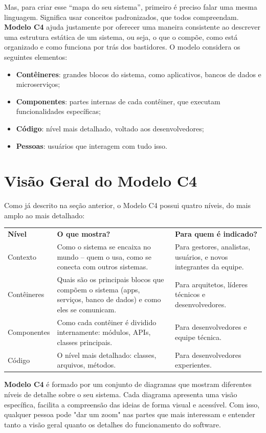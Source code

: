 \documentclass[a4paper,11pt]{article}
\begin{document}
Mas, para criar esse “mapa do seu sistema”, primeiro é preciso falar uma mesma linguagem. Significa usar conceitos padronizados, que todos compreendam. \textbf{Modelo C4} ajuda justamente por oferecer uma maneira consistente ao descrever uma estrutura estática de um sistema, ou seja, o que o compõe, como está organizado e como funciona por trás dos bastidores.
O modelo considera os seguintes elementos:
\begin{itemize}
	\item \textbf{Contêineres}: grandes blocos do sistema, como aplicativos, bancos de dados e microserviços;
	\item \textbf{Componentes}: partes internas de cada contêiner, que executam funcionalidades específicas;
	\item \textbf{Código}: nível mais detalhado, voltado aos desenvolvedores;
	\item \textbf{Pessoas}: usuários que interagem com tudo isso.
\end{itemize}

\section{Visão Geral do Modelo C4}
Como já descrito na seção anterior, o Modelo C4 possui quatro níveis, do mais amplo ao mais
detalhado:

\begin{table}[H]
	\centering 
	\begin{tabular}{C{2.3cm} | C{5.5cm} | C{5cm} }
		\textbf{Nível} & \textbf{O que mostra?} & \textbf{Para quem é indicado?} \\
		Contexto & Como o sistema se encaixa no mundo -- quem o usa, como se conecta com outros sistemas. & Para gestores, analistas, usuários, e novos integrantes da equipe. \\
		Contêineres & Quais são os principais blocos que compõem o sistema (apps, serviços,
		banco de dados) e como eles se comunicam. & Para arquitetos, líderes técnicos e desenvolvedores. \\
		Componentes & Como cada contêiner é dividido internamente: módulos, APIs, classes principais. & Para desenvolvedores e equipe técnica.  \\
		Código & O nível mais detalhado: classes, arquivos, métodos. & Para desenvolvedores
		experientes. \\
	\end{tabular}
\end{table}

\textbf{Modelo C4} é formado por um conjunto de diagramas que mostram diferentes níveis de detalhe sobre o seu sistema. Cada diagrama apresenta uma visão específica, facilita a compreensão das ideias de forma visual e acessível. Com isso, qualquer pessoa pode "dar um zoom" nas partes que mais interessam e entender tanto a visão geral quanto os detalhes do funcionamento do software.
\end{document}
